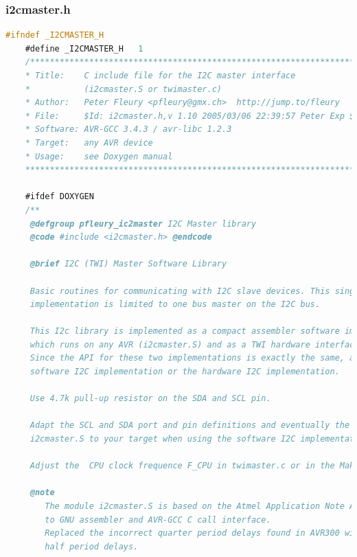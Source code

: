 \documentclass{article}
\numberwithin{figure}{section}
\numberwithin{equation}{section}
\begin{document}
{\subsubsection{i2cmaster.h}\label{sect:i2cmaster.h}
\begin{lstlisting}[language=C,label=lst:i2cmaster.h,caption=i2cmaster.h]
    #ifndef _I2CMASTER_H
    #define _I2CMASTER_H   1
    /*************************************************************************
    * Title:    C include file for the I2C master interface
    *           (i2cmaster.S or twimaster.c)
    * Author:   Peter Fleury <pfleury@gmx.ch>  http://jump.to/fleury
    * File:     $Id: i2cmaster.h,v 1.10 2005/03/06 22:39:57 Peter Exp $
    * Software: AVR-GCC 3.4.3 / avr-libc 1.2.3
    * Target:   any AVR device
    * Usage:    see Doxygen manual
    **************************************************************************/

    #ifdef DOXYGEN
    /**
     @defgroup pfleury_ic2master I2C Master library
     @code #include <i2cmaster.h> @endcode

     @brief I2C (TWI) Master Software Library

     Basic routines for communicating with I2C slave devices. This single master
     implementation is limited to one bus master on the I2C bus.

     This I2c library is implemented as a compact assembler software implementation of the I2C protocol
     which runs on any AVR (i2cmaster.S) and as a TWI hardware interface for all AVR with built-in TWI hardware (twimaster.c).
     Since the API for these two implementations is exactly the same, an application can be linked either against the
     software I2C implementation or the hardware I2C implementation.

     Use 4.7k pull-up resistor on the SDA and SCL pin.

     Adapt the SCL and SDA port and pin definitions and eventually the delay routine in the module
     i2cmaster.S to your target when using the software I2C implementation !

     Adjust the  CPU clock frequence F_CPU in twimaster.c or in the Makfile when using the TWI hardware implementaion.

     @note
        The module i2cmaster.S is based on the Atmel Application Note AVR300, corrected and adapted
        to GNU assembler and AVR-GCC C call interface.
        Replaced the incorrect quarter period delays found in AVR300 with
        half period delays.


\end{lstlisting}}
\end{document}
